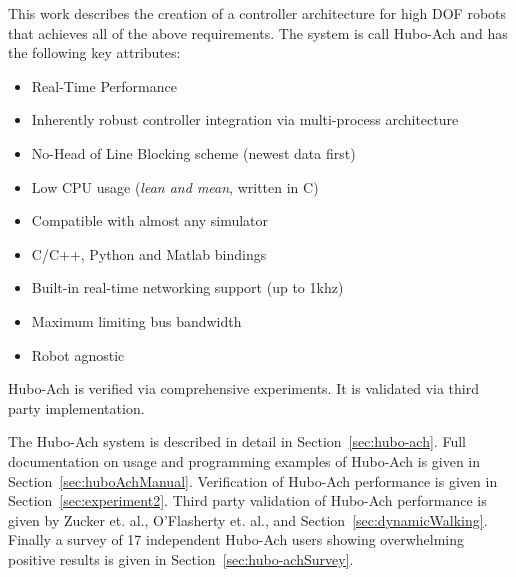 This work describes the creation of a controller architecture for high DOF robots that achieves all of the above requirements.
The system is call Hubo-Ach and has the following key attributes: 
\begin{itemize}
\item Real-Time Performance
\item Inherently robust controller integration via multi-process architecture 
\item No-Head of Line Blocking scheme (newest data first)
\item Low CPU usage (\textit{lean and mean}, written in C)
\item Compatible with almost any simulator
\item C/C++, Python and Matlab bindings
\item Built-in real-time networking support (up to 1khz)
\item Maximum limiting bus bandwidth
\item Robot agnostic
\end{itemize}

Hubo-Ach is verified via comprehensive experiments.
It is validated via third party implementation. 

The Hubo-Ach system is described in detail in Section~\ref{sec:hubo-ach}.
Full documentation on usage and programming examples of Hubo-Ach is given in Section~\ref{sec:huboAchManual}.
Verification of Hubo-Ach performance is given in Section~\ref{sec:experiment2}.
Third party validation of Hubo-Ach performance is given by Zucker et. al.\cite{tepraDoor2013}, O'Flasherty et. al.\cite{tepraCut2013}, and Section~\ref{sec:dynamicWalking}.
Finally a survey of 17 independent Hubo-Ach users showing overwhelming positive results is given in Section~\ref{sec:hubo-achSurvey}.


































